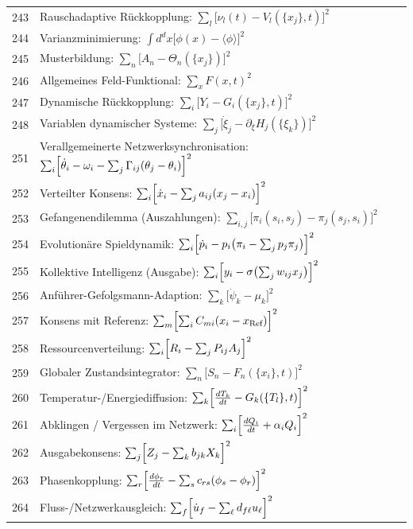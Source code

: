 \documentclass[11pt,a4paper]{article}
\begin{document}
\begin{longtable}{r l}
		243 & Rauschadaptive Rückkopplung: $\sum_l\bigl[\nu_l(t) - V_l(\{x_j\},t)\bigr]^2$ \\
		244 & Varianzminimierung: $\int d^dx\bigl[\phi(x) - \langle\phi\rangle\bigr]^2$ \\
		245 & Musterbildung: $\sum_n\bigl[A_n - \Theta_n(\{x_j\})\bigr]^2$ \\
		246 & Allgemeines Feld-Funktional: $\sum_x F(x,t)^2$ \\
		247 & Dynamische Rückkopplung: $\sum_i\bigl[Y_i - G_i(\{x_j\},t)\bigr]^2$ \\
		248 & Variablen dynamischer Systeme: $\sum_j\bigl[\dot\xi_j - \partial_\xi H_j(\{\xi_k\})\bigr]^2$ \\
		251 & Verallgemeinerte Netzwerksynchronisation: $\sum_i\Bigl[\dot\theta_i - \omega_i - \sum_j\Gamma_{ij}(\theta_j-\theta_i)\Bigr]^2$ \\
		252 & Verteilter Konsens: $\sum_i\Bigl[\dot x_i - \sum_j a_{ij}(x_j-x_i)\Bigr]^2$ \\
		253 & Gefangenendilemma (Auszahlungen): $\sum_{i,j}\bigl[\pi_i(s_i,s_j) - \pi_j(s_j,s_i)\bigr]^2$ \\
		254 & Evolutionäre Spieldynamik: $\sum_i\Bigl[\dot p_i - p_i\bigl(\pi_i - \sum_j p_j\pi_j\bigr)\Bigr]^2$ \\
		255 & Kollektive Intelligenz (Ausgabe): $\sum_i\Bigl[y_i - \sigma\bigl(\sum_j w_{ij}x_j\bigr)\Bigr]^2$ \\
		256 & Anführer-Gefolgsmann-Adaption: $\sum_k\bigl[\dot\psi_k - \mu_k\bigr]^2$ \\
		257 & Konsens mit Referenz: $\sum_m\Bigl[\sum_i C_{mi}(x_i-x_{\text{Ref}})\Bigr]^2$ \\
		258 & Ressourcenverteilung: $\sum_i\Bigl[R_i - \sum_j P_{ij}A_j\Bigr]^2$ \\
		259 & Globaler Zustandsintegrator: $\sum_n\bigl[S_n - F_n(\{x_i\},t)\bigr]^2$ \\
		260 & Temperatur-/Energiediffusion: $\sum_k\Bigl[\frac{dT_k}{dt} - G_k(\{T_l\},t)\Bigr]^2$ \\
		261 & Abklingen / Vergessen im Netzwerk: $\sum_i\Bigl[\frac{dQ_i}{dt} + \alpha_i Q_i\Bigr]^2$ \\
		262 & Ausgabekonsens: $\sum_j\Bigl[Z_j - \sum_k b_{jk}X_k\Bigr]^2$ \\
		263 & Phasenkopplung: $\sum_r\Bigl[\frac{d\phi_r}{dt} - \sum_s c_{rs}(\phi_s-\phi_r)\Bigr]^2$ \\
		264 & Fluss-/Netzwerkausgleich: $\sum_f\Bigl[\dot u_f - \sum_\ell d_{f\ell}u_\ell\Bigr]^2$ \\

\end{longtable}
\end{document}
